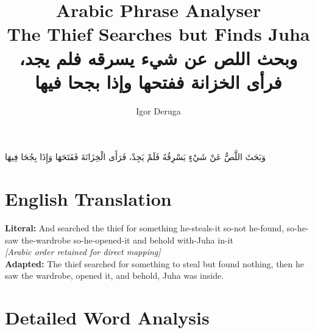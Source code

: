 \documentclass[letterpaper,12pt]{article}
\begin{document}
\title{\textbf{\Large Arabic Phrase Analyser}\\
\large The Thief Searches but Finds Juha\\
\normalsize \textarabic{وبحث اللص عن شيء يسرقه فلم يجد، فرأى الخزانة ففتحها وإذا بجحا فيها}}
\author{Igor Deruga}
\date{}
\maketitle

\begin{tcolorbox}[colback=boxcolor,colframe=headercolor,title=\textbf{Arabic Phrase with Full Diactrics},breakable]
\centering
\textarabic{وَبَحَثَ اللَّصُّ عَنْ شَيْءٍ يَسْرِقُهُ فَلَمْ يَجِدْ، فَرَأَى الْخِزَانَةَ فَفَتَحَهَا وَإِذَا بِجُحَا فِيهَا}
\end{tcolorbox}

\section{English Translation}
\begin{tcolorbox}[colback=white,colframe=accentcolor,breakable]
\textbf{Literal:} And searched the thief for something he-steals-it so-not he-found, so-he-saw the-wardrobe so-he-opened-it and behold with-Juha in-it \\
\textit{[Arabic order retained for direct mapping]}\\[0.5em]
\textbf{Adapted:} The thief searched for something to steal but found nothing, then he saw the wardrobe, opened it, and behold, Juha was inside.
\end{tcolorbox}

\section{Detailed Word Analysis}
\end{document}
